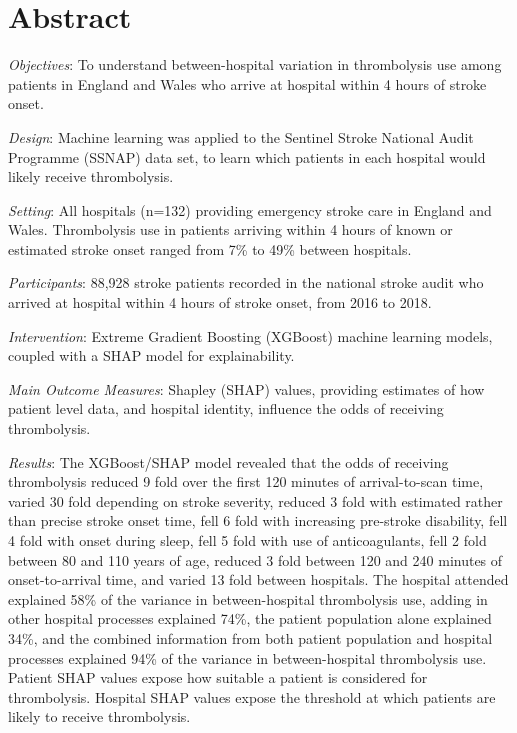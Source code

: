 \section*{Abstract}

\emph{Objectives}: To understand between-hospital variation in thrombolysis use among patients in England and Wales who arrive at hospital within 4 hours of stroke onset.

\emph{Design}: Machine learning was applied to the Sentinel Stroke National Audit Programme (SSNAP)  data set, to learn which patients in each hospital would likely receive thrombolysis.

\emph{Setting}: All hospitals (n=132) providing emergency stroke care in England and Wales. Thrombolysis use in patients arriving within 4 hours of known or estimated stroke onset ranged from 7\% to 49\% between hospitals.

\emph{Participants}: 88,928 stroke patients recorded in the national stroke audit who arrived at hospital within 4 hours of stroke onset, from 2016 to 2018.

\emph{Intervention}: Extreme Gradient Boosting (XGBoost) machine learning models, coupled with a SHAP model for explainability.

\emph{Main Outcome Measures}: Shapley (SHAP) values, providing estimates of how patient level data, and hospital identity, influence the odds of receiving thrombolysis.

\emph{Results}: The XGBoost/SHAP model revealed that the odds of receiving thrombolysis reduced 9 fold over the first 120 minutes of arrival-to-scan time, varied 30 fold depending on stroke severity, reduced 3 fold with estimated rather than precise stroke onset time, fell 6 fold with increasing pre-stroke disability, fell 4 fold with onset during sleep, fell 5 fold with use of anticoagulants, fell 2 fold between 80 and 110 years of age, reduced 3 fold between 120 and 240 minutes of onset-to-arrival time, and varied 13 fold between hospitals. The hospital attended explained 58\% of the variance in between-hospital thrombolysis use, adding in other hospital processes explained 74\%, the patient population alone explained 34\%, and the combined information from both patient population and hospital processes explained 94\% of the variance in between-hospital thrombolysis use. %
Patient SHAP values expose how suitable a patient is considered for thrombolysis. Hospital SHAP values expose the threshold at which patients are likely to receive thrombolysis.


